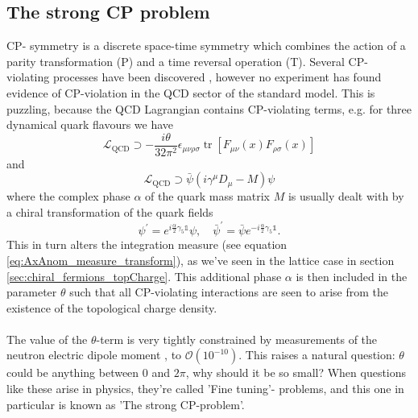 \documentclass[a4paper,10pt]{book}
\begin{document}
\subsection{The strong CP problem}
CP- symmetry is a discrete space-time symmetry which combines the action of a parity transformation (P) and a time reversal operation (T). Several CP- violating processes have been discovered \cite{aaij2013first}\cite{aaij2019observation}, however no experiment has found evidence of CP-violation in the QCD sector of the standard model. This is puzzling, because the QCD Lagrangian contains CP-violating terms, e.g. for three dynamical quark flavours we have
\begin{equation}
\mathcal{L}_{\mathrm{QCD}} \supset -\frac{i\theta }{32\pi^2}\epsilon_{\mu \nu \rho \sigma} \operatorname{tr}\left[F_{\mu \nu}(x) F_{\rho \sigma}(x)\right]
\end{equation}
and
\begin{equation}
\mathcal{L}_{\mathrm{QCD}} \supset \bar{\psi}\left(i \gamma^{\mu} D_{\mu}-M \right) \psi
\end{equation}
where the complex phase $\alpha$ of the quark mass matrix $M$ is usually dealt with by a chiral transformation of the quark fields
\begin{equation}
\psi^{\prime}=e^{i \frac{\alpha}{2} \gamma_{5}\mathbb{1}} \psi, \quad \bar{\psi}^{\prime}=\bar{\psi} e^{-i \frac{\alpha}{2} \gamma_{5}\mathbb{1}}.
\end{equation}
This in turn alters the integration measure (see equation \eqref{eq:AxAnom_measure_transform}), as we've seen in the lattice case in section \ref{sec:chiral_fermions_topCharge}. This additional phase $\alpha$ is then included in the parameter $\theta$ such that all CP-violating interactions are seen to arise from the existence of the topological charge density.\\\\The value of the $\theta$-term is very tightly constrained by measurements of the neutron electric dipole moment \cite{PhysRevLett.97.131801}, to $\mathcal{O}(10^{-10})$. This raises a natural question: $\theta$ could be anything between $0$ and $2\pi$, why should it be so small? When questions like these arise in physics, they're called 'Fine tuning'- problems, and this one in particular is known as 'The strong CP-problem'. 
\end{document}
